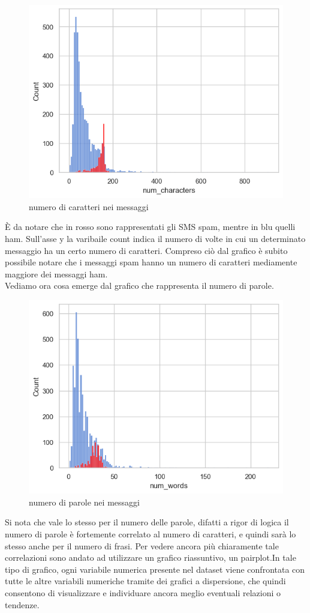 \documentclass[]{article}
\begin{document}
        \begin{figure}[H]
            \centering
            \includegraphics[width=0.6\linewidth]{images/num_char.png}
            \caption{numero di caratteri nei messaggi}
            \label{fig:enter-label}
        \end{figure}

        È da notare che in rosso sono rappresentati gli SMS spam, mentre in blu quelli ham. Sull'asse y la varibaile count indica il numero di volte in cui un determinato messaggio ha un certo numero di caratteri. Compreso ciò dal grafico è subito possibile notare che i messaggi spam hanno un numero di caratteri mediamente maggiore dei messaggi ham. \\
        Vediamo ora cosa emerge dal grafico che rappresenta il numero di parole.\\

        \begin{figure}[H]
            \centering
            \includegraphics[width=0.6\linewidth]{images/num_words.png}
            \caption{numero di parole nei messaggi}
            \label{fig:enter-label}
        \end{figure}

        Si nota che vale lo stesso per il numero delle parole, difatti a rigor di logica il numero di parole è fortemente correlato al numero di caratteri, e quindi sarà lo stesso anche per il numero di frasi. Per vedere ancora più chiaramente tale correlazioni sono andato ad utilizzare un grafico riassuntivo, un pairplot.In tale tipo di grafico, ogni variabile numerica presente nel dataset viene confrontata con tutte le altre variabili numeriche tramite dei grafici a dispersione, che quindi consentono di visualizzare e individuare ancora meglio eventuali relazioni o tendenze.
\end{document}

